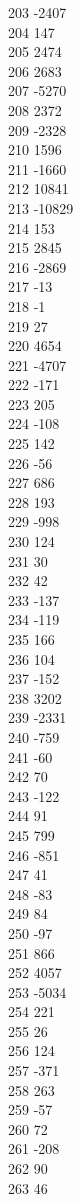 { 203	-2407 \\
 204	147 \\
 205	2474 \\
 206	2683 \\
 207	-5270 \\
 208	2372 \\
 209	-2328 \\
 210	1596 \\
 211	-1660 \\
 212	10841 \\
 213	-10829 \\
 214	153 \\
 215	2845 \\
 216	-2869 \\
 217	-13 \\
 218	-1 \\
 219	27 \\
 220	4654 \\
 221	-4707 \\
 222	-171 \\
 223	205 \\
 224	-108 \\
 225	142 \\
 226	-56 \\
 227	686 \\
 228	193 \\
 229	-998 \\
 230	124 \\
 231	30 \\
 232	42 \\
 233	-137 \\
 234	-119 \\
 235	166 \\
 236	104 \\
 237	-152 \\
 238	3202 \\
 239	-2331 \\
 240	-759 \\
 241	-60 \\
 242	70 \\
 243	-122 \\
 244	91 \\
 245	799 \\
 246	-851 \\
 247	41 \\
 248	-83 \\
 249	84 \\
 250	-97 \\
 251	866 \\
 252	4057 \\
 253	-5034 \\
 254	221 \\
 255	26 \\
 256	124 \\
 257	-371 \\
 258	263 \\
 259	-57 \\
 260	72 \\
 261	-208 \\
 262	90 \\
 263	46 \\
}
